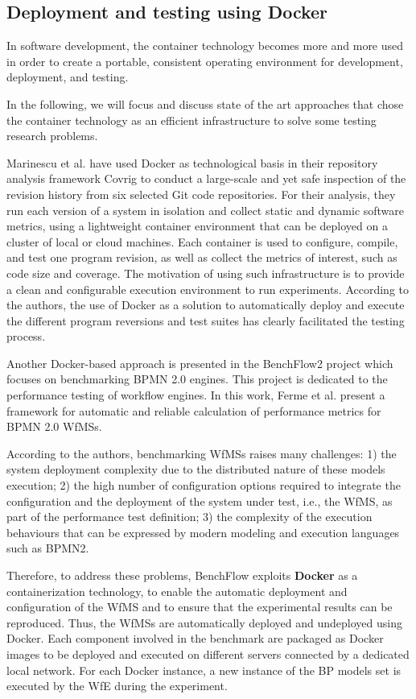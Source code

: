\subsection{Deployment and testing using Docker}  
In software development, the container technology becomes more and more used in order to create a portable, consistent operating environment for development, deployment, and testing.

In the following, we will focus and discuss state of the art approaches that chose the container technology as an efficient infrastructure to solve some testing research problems. 


Marinescu et al.\cite{marinescu2014covrig} have used Docker as technological basis in their repository analysis framework Covrig to conduct a large-scale and yet safe inspection of the revision history from six selected Git code repositories. 
For their analysis, they run each version of a system in isolation and collect static and dynamic software metrics, using a lightweight container environment that can be deployed on a cluster of local or cloud machines. Each container is used to configure, compile, and test one program revision, as well as collect the metrics of interest, such as code size and coverage.
The motivation of using such infrastructure is to provide a clean and configurable execution environment to run experiments. According to the authors, the use of Docker as a solution to automatically deploy and execute the different program reversions and test suites has clearly facilitated the testing process.


Another Docker-based approach is presented in the BenchFlow2 project which focuses on benchmarking BPMN 2.0 engines\cite{ferme2015framework}. This project is dedicated to the performance testing of workflow engines. In this work, Ferme et al. present a framework for automatic and reliable calculation of performance metrics for BPMN 2.0 WfMSs. 

According to the authors, benchmarking WfMSs raises many challenges: 1) the system deployment complexity due to the distributed nature of these models execution; 2) the high number of configuration options required to integrate the configuration and the deployment of the system under test, i.e., the WfMS, as part of the performance test definition; 3) the complexity of the execution behaviours that can be expressed by modern modeling and execution languages such as BPMN2.

Therefore, to address these problems, BenchFlow exploits \textbf{Docker} as a containerization technology, to enable the automatic deployment and configuration of the WfMS and to ensure that the experimental results can be reproduced.
Thus, the WfMSs are automatically deployed and undeployed using Docker. Each component involved in the benchmark are packaged as Docker images
to be deployed and executed on different servers connected by a dedicated local
network. For each Docker instance, a new instance of the BP models set is executed by the WfE during the experiment.

